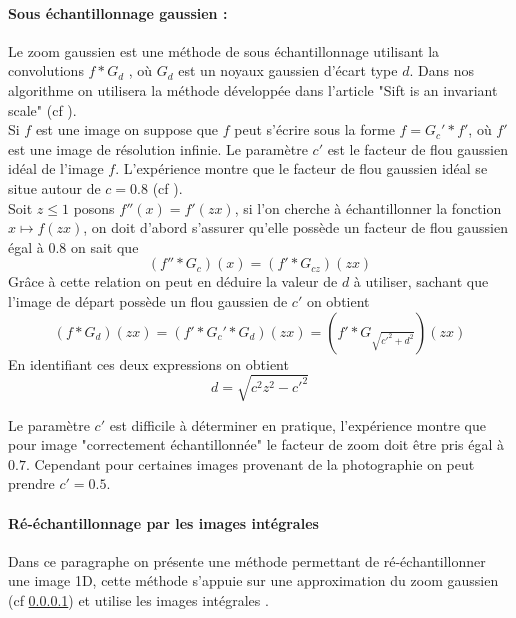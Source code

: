 \paragraph{Sous échantillonnage gaussien :}
\label{zoom_gaussien}
Le zoom gaussien est une méthode de sous échantillonnage utilisant la convolutions $f*G_{d}$ , où $G_d$ est un noyaux gaussien d'écart type $d$. Dans nos algorithme on utilisera la méthode développée dans l'article "Sift is an invariant scale" (cf \cite{morel2011sift}).\\
Si $f$ est une image on suppose que $f$ peut s'écrire sous la forme $f=G_c' * f'$, où $f'$ est une image de résolution infinie. Le paramètre $c'$ est le facteur de flou gaussien idéal de l'image $f$. L'expérience montre que le facteur de flou gaussien idéal se situe autour de $c=0.8$ (cf \cite{morel2011sift}).\\
Soit $z\le 1$ posons $f''(x)=f'(zx)$, si l'on cherche à échantillonner la fonction  $x\mapsto f(zx)$,  on doit d'abord s'assurer qu'elle possède un facteur de flou gaussien égal à $0.8$ on sait que 
\begin{equation*}
(f''*G_{c})(x)=(f'*G_{cz})(zx)
\end{equation*}
Grâce à cette relation on peut en déduire la valeur de $d$ à utiliser, sachant que l'image de départ possède un flou gaussien de $c'$ on obtient
\begin{equation*}
(f*G_d)(zx)=(f'*G_c'*G_d)(zx)=(f'*G_{\sqrt{c'^2 + d^2}})(zx)
\end{equation*}
En identifiant ces deux expressions on obtient
\begin{equation}
d=\sqrt{c^2 z^2 - c'^2}
\label{formule_zoom_gaussien}
\end{equation}

Le paramètre $c'$ est difficile à déterminer en pratique, l'expérience montre que pour image "correctement échantillonnée" le facteur de zoom doit être pris égal à $0.7$. Cependant pour certaines images provenant de la photographie on peut prendre $c'=0.5$.\\

\paragraph{Ré-échantillonnage par les images intégrales }
\label{4Integral}
Dans ce paragraphe on présente une méthode permettant de ré-échantillonner une image 1D, cette méthode s'appuie sur une approximation du zoom gaussien (cf \ref{zoom_gaussien}) et utilise les images intégrales .\\


